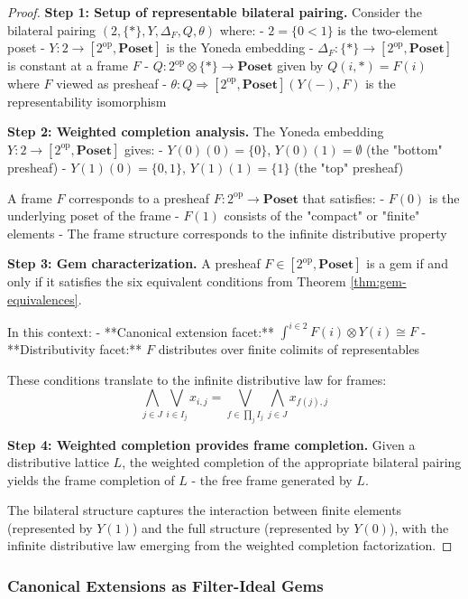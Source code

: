 \documentclass[11pt]{article}
\theoremstyle{plain}
\theoremstyle{definition}
\theoremstyle{remark}
\newcommand{\op}{\mathrm{op}}
\begin{document}
\begin{proof}
\textbf{Step 1: Setup of representable bilateral pairing.}
Consider the bilateral pairing $(2, \{\ast\}, Y, \Delta_F, Q, \theta)$ where:
- $2 = \{0 < 1\}$ is the two-element poset
- $Y : 2 \to [2^{\op}, \mathbf{Poset}]$ is the Yoneda embedding
- $\Delta_F : \{\ast\} \to [2^{\op}, \mathbf{Poset}]$ is constant at a frame $F$
- $Q : 2^{\op} \otimes \{\ast\} \to \mathbf{Poset}$ given by $Q(i, \ast) = F(i)$ where $F$ viewed as presheaf
- $\theta : Q \Rightarrow [2^{\op}, \mathbf{Poset}](Y(-), F)$ is the representability isomorphism

\textbf{Step 2: Weighted completion analysis.}
The Yoneda embedding $Y : 2 \to [2^{\op}, \mathbf{Poset}]$ gives:
- $Y(0)(0) = \{0\}$, $Y(0)(1) = \emptyset$ (the "bottom" presheaf)
- $Y(1)(0) = \{0, 1\}$, $Y(1)(1) = \{1\}$ (the "top" presheaf)

A frame $F$ corresponds to a presheaf $F : 2^{\op} \to \mathbf{Poset}$ that satisfies:
- $F(0)$ is the underlying poset of the frame
- $F(1)$ consists of the "compact" or "finite" elements
- The frame structure corresponds to the infinite distributive property

\textbf{Step 3: Gem characterization.}
A presheaf $F \in [2^{\op}, \mathbf{Poset}]$ is a gem if and only if it satisfies the six equivalent conditions from Theorem \ref{thm:gem-equivalences}.

In this context:
- **Canonical extension facet:** $\int^{i \in 2} F(i) \otimes Y(i) \cong F$
- **Distributivity facet:** $F$ distributes over finite colimits of representables

These conditions translate to the infinite distributive law for frames:
$$\bigwedge_{j \in J} \bigvee_{i \in I_j} x_{i,j} = \bigvee_{f \in \prod_j I_j} \bigwedge_{j \in J} x_{f(j),j}$$

\textbf{Step 4: Weighted completion provides frame completion.}
Given a distributive lattice $L$, the weighted completion of the appropriate bilateral pairing yields the frame completion of $L$ - the free frame generated by $L$.

The bilateral structure captures the interaction between finite elements (represented by $Y(1)$) and the full structure (represented by $Y(0)$), with the infinite distributive law emerging from the weighted completion factorization.
\end{proof}

\subsubsection{Canonical Extensions as Filter-Ideal Gems}
\end{document}
